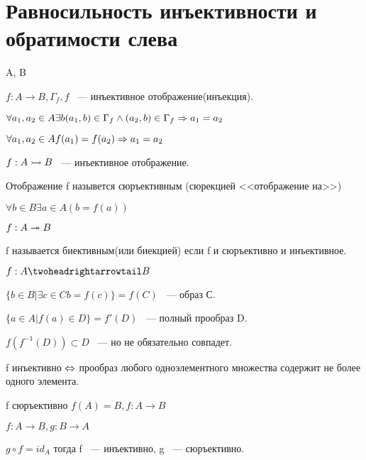 ﻿\section{Равносильность инъективности и обратимости слева}

\begin{Def}
A, B

$f: A \to B, \Gamma_f, f$ ~--- инъективное отображение(инъекция).

$\forall a_1, a_2 \in A \exists b (a_1, b) \in \Gamma_f \wedge (a_2, b) \in \Gamma_f \Rightarrow a_1 = a_2$

$\forall a_1, a_2 \in A f(a_1) = f(a_2) \Rightarrow a_1 = a_2$

$f: A \rightarrowtail B$ ~--- инъективное отображение. 
\end{Def}


\begin{Def}
Отображение f назывется  сюръективным (сюрекцией <<отображение на>>)

$\forall b \in B \exists a \in A (b = f(a))$

$f: A \twoheadrightarrow B$

\end{Def}

\begin{Def}
f называется биективным(или биекцией) если f и сюръективно и инъективное. 

$f: A \thrat B$
 
$\{b \in B| \exists c \in C b = f(c)\} = f(C)$ ~--- образ С.

$\{a \in A| f(a) \in D\} = f'(D)$ ~--- полный прообраз D.
\end{Def}

$f(f^{-1}(D)) \subset D$ ~--- но не обязательно совпадет.

f инъективно $\Leftrightarrow$ прообраз любого одноэлементного множества содержит не более одного элемента. 

f сюръективно $f(A) = B, f:A \to B$

\begin{theorem}{}
$f:A \to B, g:B \to A$

$g \circ f = id_A$ тогда f ~--- инъективно, g ~--- сюръективно.
\end{theorem}

